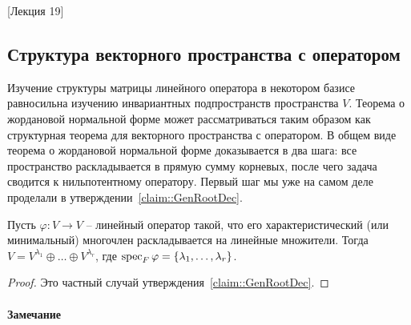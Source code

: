 [Лекция 19]


\subsection{Структура векторного пространства с оператором}

Изучение структуры матрицы линейного оператора в некотором базисе равносильна изучению инвариантных подпространств пространства $V$.
Теорема о жордановой нормальной форме может рассматриваться таким образом как структурная теорема для векторного пространства с оператором.
В общем виде теорема о жордановой нормальной форме доказывается в два шага: все пространство раскладывается в прямую сумму корневых, после чего задача сводится к нильпотентному оператору.
Первый шаг мы уже на самом деле проделали в утверждении~\ref{claim::GenRootDec}.

\begin{claim}
\label{claim::RootSpaceDec}
Пусть $\varphi\colon V\to V$ -- линейный оператор такой, что его характеристический (или минимальный) многочлен раскладывается на линейные множители.
Тогда $V = V^{\lambda_1} \oplus \ldots\oplus V^{\lambda_r}$, где $\operatorname{spec}_F \varphi = \{\lambda_1,\ldots, \lambda_r\}$.
\end{claim}
\begin{proof}
Это частный случай утверждения~\ref{claim::GenRootDec}.
\end{proof}

\paragraph{Замечание}

